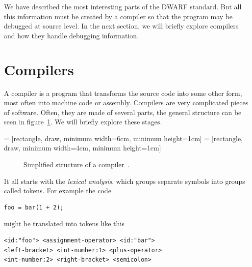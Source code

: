 We have described the most interesting parts of the DWARF standard. But all
this information must be created by a compiler so that the program
may be debugged at source level. In the next section, we will briefly explore
compilers and how they handle debugging information.

\section{Compilers}
A compiler is a program that transforms the source code into some other form,
most often into machine code or assembly. Compilers are very complicated pieces
of software. Often, they are made of several parts, the general structure can
be seen in figure~\ref{fig:compiler-structure}. We will briefly explore these
stages.

 = [rectangle, draw, minimum width=6cm, minimum height=1cm] 
 = [rectangle, draw, minimum width=4cm, minimum height=1cm] 
\begin{figure}
    {\centering
    \par}
    \caption{Simplified structure of a compiler~\cite{dragon-book}.}
    \label{fig:compiler-structure}
\end{figure}

It all starts with the \textit{lexical analysis}, which groups separate symbols
into groups called tokens. For example the code
\begin{verbatim}
foo = bar(1 + 2);
\end{verbatim}
might be translated into tokens like this
\begin{lstlisting}[stringstyle=\color{black}]
<id:"foo"> <assignment-operator> <id:"bar"> 
<left-bracket> <int-number:1> <plus-operator> 
<int-number:2> <right-bracket> <semicolon>
\end{lstlisting}


